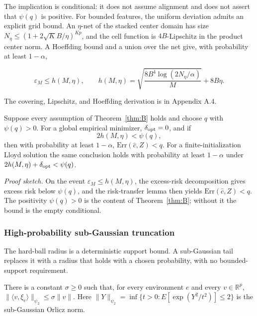 The implication is conditional: it does not assume alignment and does
not assert that \(\psi(q)\) is positive. For bounded features, the
uniform deviation admits an explicit grid bound. An \(\eta\)-net of the
stacked center domain has size \(N_\eta\le(1+2\sqrt K B/\eta)^{Kp}\),
and the cell function is \(4B\)-Lipschitz in the product center norm. A
Hoeffding bound and a union over the net give, with probability at least
\(1-\alpha\),

\[\varepsilon_M\le h(M,\eta),\qquad
h(M,\eta)=\sqrt{\frac{8B^4\log(2N_\eta/\alpha)}{M}}+8B\eta.\]

The covering, Lipschitz, and Hoeffding derivation is in Appendix A.4.

\begin{corollary}\label{cor:finite}
Suppose every assumption of Theorem~\ref{thm:B} holds and choose $q$ with $\psi(q)>0$. For a global empirical minimizer, $\delta_{\rm opt}=0$, and if
$$2h(M,\eta)<\psi(q),$$
then with probability at least $1-\alpha$, $\mathrm{Err}(\widehat c,Z)<q$. For a finite-initialization Lloyd solution the same conclusion holds with probability at least $1-\alpha$ under $2h(M,\eta)+\delta_{\rm opt}<\psi(q)$.
\end{corollary}

\emph{Proof sketch.} On the event \(\varepsilon_M\le h(M,\eta)\), the
excess-risk decomposition gives excess risk below \(\psi(q)\), and the
risk-transfer lemma then yields \(\mathrm{Err}(\widehat c,Z)<q\). The
positivity \(\psi(q)>0\) is the content of
Theorem~\ref{thm:B}; without it the bound is the empty
conditional.

\subsubsection{High-probability sub-Gaussian
truncation}\label{high-probability-sub-gaussian-truncation}

The hard-ball radius is a deterministic support bound. A sub-Gaussian
tail replaces it with a radius that holds with a chosen probability,
with no bounded-support requirement.

\begin{assumption}\label{a:sg}
There is a constant $\sigma\ge 0$ such that, for every environment $e$ and every $v\in\mathbb R^p$, $\|\langle v,\xi_e\rangle\|_{\psi_2}\le \sigma\|v\|$. Here $\|Y\|_{\psi_2}=\inf\{t>0:E[\exp(Y^2/t^2)]\le 2\}$ is the sub-Gaussian Orlicz norm.
\end{assumption}

